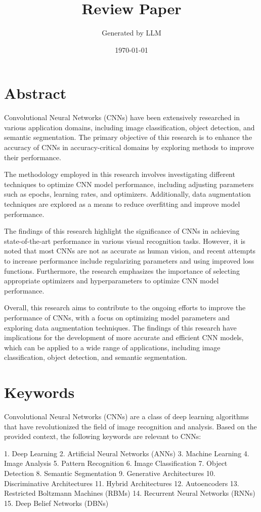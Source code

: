 \documentclass[a4paper,twocolumn]{article}%
\title{Review Paper}%
\author{Generated by LLM}%
\date{\today}%
\begin{document}
%
\normalsize%
\maketitle%
\section*{Abstract}%
\label{sec:Abstract}%
Convolutional Neural Networks (CNNs) have been extensively researched in various application domains, including image classification, object detection, and semantic segmentation. The primary objective of this research is to enhance the accuracy of CNNs in accuracy-critical domains by exploring methods to improve their performance.

The methodology employed in this research involves investigating different techniques to optimize CNN model performance, including adjusting parameters such as epochs, learning rates, and optimizers. Additionally, data augmentation techniques are explored as a means to reduce overfitting and improve model performance.

The findings of this research highlight the significance of CNNs in achieving state-of-the-art performance in various visual recognition tasks. However, it is noted that most CNNs are not as accurate as human vision, and recent attempts to increase performance include regularizing parameters and using improved loss functions. Furthermore, the research emphasizes the importance of selecting appropriate optimizers and hyperparameters to optimize CNN model performance.

Overall, this research aims to contribute to the ongoing efforts to improve the performance of CNNs, with a focus on optimizing model parameters and exploring data augmentation techniques. The findings of this research have implications for the development of more accurate and efficient CNN models, which can be applied to a wide range of applications, including image classification, object detection, and semantic segmentation.

%
\section*{Keywords}%
\label{sec:Keywords}%
Convolutional Neural Networks (CNNs) are a class of deep learning algorithms that have revolutionized the field of image recognition and analysis. Based on the provided context, the following keywords are relevant to CNNs:

1. Deep Learning
2. Artificial Neural Networks (ANNs)
3. Machine Learning
4. Image Analysis
5. Pattern Recognition
6. Image Classification
7. Object Detection
8. Semantic Segmentation
9. Generative Architectures
10. Discriminative Architectures
11. Hybrid Architectures
12. Autoencoders
13. Restricted Boltzmann Machines (RBMs)
14. Recurrent Neural Networks (RNNs)
15. Deep Belief Networks (DBNs)
\end{document}
